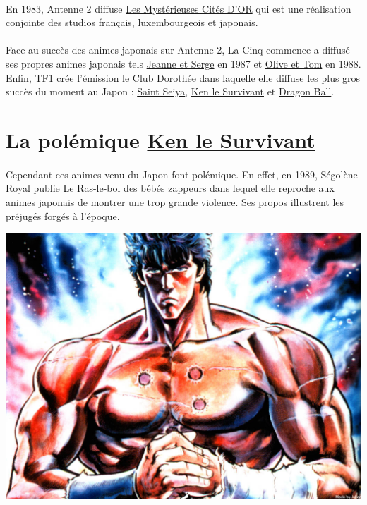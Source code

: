 \paragraph{} En 1983, Antenne 2 diffuse \underline{Les Mystérieuses Cités D’OR}
qui est une réalisation conjointe des studios français, luxembourgeois et
japonais. 

\paragraph{} Face au succès des animes japonais sur Antenne 2, La Cinq commence
a diffusé ses propres animes japonais tels \underline{Jeanne et Serge} en 1987
et \underline{Olive et Tom} en 1988. Enfin, TF1 crée l’émission le Club
Dorothée dans laquelle elle diffuse les plus gros succès du moment au Japon :
\underline{Saint Seiya}, \underline{Ken le Survivant} et \underline{Dragon
Ball}. 

\section{La polémique \underline{Ken le Survivant}}

\paragraph{} Cependant ces animes venu du Japon font polémique. En effet, en
1989, Ségolène Royal publie \underline{Le Ras-le-bol des bébés zappeurs} dans
lequel elle reproche aux animes japonais de montrer une trop grande violence.
Ses propos illustrent les préjugés forgés à l’époque. 

\begin{center}
	\includegraphics[scale=0.15]{ken.jpg}
\end{center}

